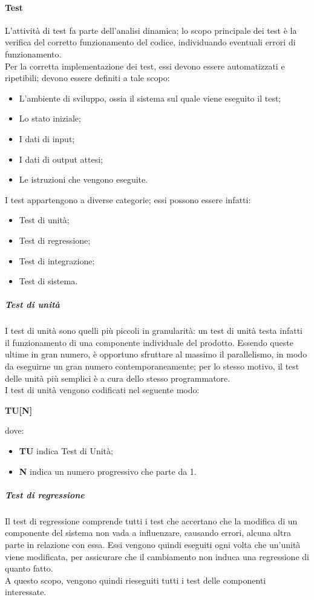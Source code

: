 \documentclass[../norme-di-progetto.tex]{subfiles}
\begin{document}
\paragraph{Test}
L'attività di test fa parte dell'analisi dinamica; lo scopo principale dei test è la verifica del corretto funzionamento del codice, individuando eventuali errori di funzionamento. \\
Per la corretta implementazione dei test, essi devono essere automatizzati e ripetibili; devono essere definiti a tale scopo:
\begin{itemize}
  \item L'ambiente di sviluppo, ossia il sistema sul quale viene eseguito il test;
  \item Lo stato iniziale;
  \item I dati di input;
  \item I dati di output attesi;
  \item Le istruzioni che vengono eseguite.
\end{itemize}
I test appartengono a diverse categorie; essi possono essere infatti:
\begin{itemize}
  \item Test di unità;
  \item Test di regressione;
  \item Test di integrazione;
  \item Test di sistema.
\end{itemize}

\subparagraph*{Test di unità}
I test di unità sono quelli più piccoli in granularità: un test di unità testa infatti il funzionamento di una componente individuale del prodotto. Essendo queste ultime in gran numero, è opportuno sfruttare al massimo il parallelismo, in modo da eseguirne un gran numero contemporaneamente; per lo stesso motivo, il test delle unità più semplici è a cura dello stesso programmatore. \\
I test di unità vengono codificati nel seguente modo:
\begin{center}
  \centering
  \textbf{TU[N]}
\end{center} dove:
\begin{itemize}
  \item \textbf{TU} indica Test di Unità;
  \item \textbf{N} indica un numero progressivo che parte da 1.
\end{itemize}

\subparagraph*{Test di regressione}
Il test di regressione comprende tutti i test che accertano che la modifica di un componente del sistema non vada a influenzare, causando errori, alcuna altra parte in relazione con essa. Essi vengono quindi eseguiti ogni volta che un'unità viene modificata, per assicurare che il cambiamento non induca una regressione di quanto fatto. \\
A questo scopo, vengono quindi rieseguiti tutti i test delle componenti interessate.
\end{document}
